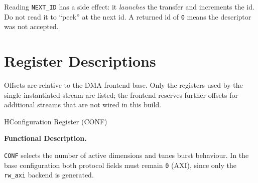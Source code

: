 \begin{docnote}
Reading \texttt{NEXT\_ID} has a side effect: it \emph{launches} the transfer and increments the id. Do
not read it to ``peek'' at the next id. A returned id of \texttt{0} means the descriptor was not
accepted.
\end{docnote}

\section{Register Descriptions}
Offsets are relative to the DMA frontend base. Only the registers used by the single instantiated
stream are listed; the frontend reserves further offsets for additional streams that are not wired in
this build.



\begin{register}{H}{Configuration Register (CONF)}{}


\end{register}

\textbf{Functional Description.}

\texttt{CONF} selects the number of active dimensions and tunes burst behaviour. In the base
configuration both protocol fields must remain \texttt{0} (AXI), since only the \texttt{rw\_axi} backend
is generated.

